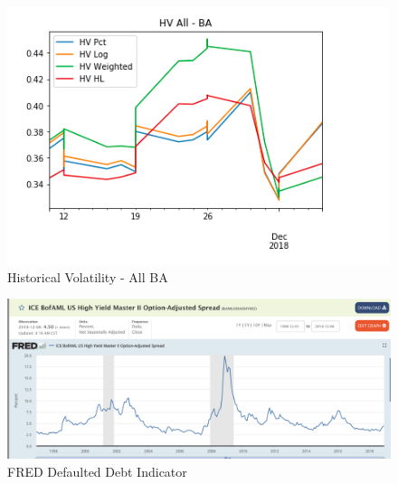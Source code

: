 \documentclass{article}
\begin{document}
\begin{figure}[h!]
\includegraphics[width =\textwidth]{images/HV/HV-ALL-BA.png}
\caption{Historical Volatility - All BA}
\centering
\end{figure}

\begin{figure}[h!]
\includegraphics[width =\textwidth]{images/BAMF.png}
\caption{FRED Defaulted Debt Indicator}
\centering
\end{figure}
\end{document}
